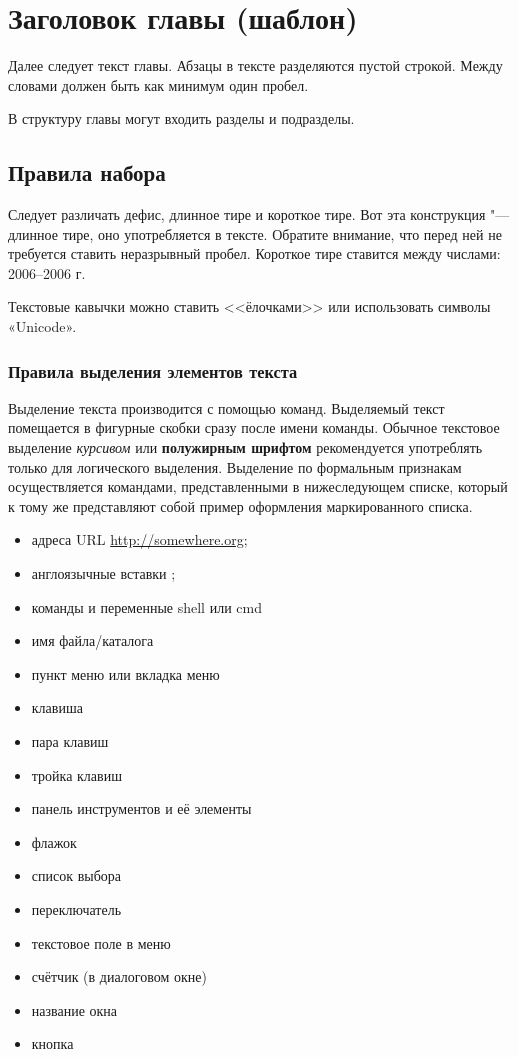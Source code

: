 \chapter{Заголовок главы (шаблон)}

Далее следует текст главы. Абзацы в тексте разделяются пустой
строкой. Между словами должен быть как минимум один пробел. 

В структуру главы могут входить разделы и
подразделы.

\section{Правила набора}

Следует различать дефис, длинное тире и короткое тире. Вот эта конструкция "--- длинное
тире, оно употребляется в тексте. Обратите внимание, что перед ней не требуется ставить
неразрывный пробел. Короткое тире ставится между числами: 2006--2006 г.

Текстовые кавычки можно ставить <<ёлочками>> или использовать
символы «Unicode».

\subsection{Правила выделения элементов текста}

Выделение текста производится с помощью команд. Выделяемый текст
помещается в фигурные скобки сразу после имени команды. Обычное
текстовое выделение \emph{курсивом} или \textbf{полужирным шрифтом}
рекомендуется употреблять только для логического выделения. Выделение
по формальным признакам осуществляется командами, представленными в
нижеследующем списке, который к тому же представляют собой пример оформления
маркированного списка.

\begin{itemize}
\item адреса URL \url{http://somewhere.org};
\item англоязычные вставки ;
\item команды и переменные shell или cmd 
\item имя файла/каталога 
\item пункт меню или вкладка меню 
\item клавиша 
\item пара клавиш 
\item тройка клавиш 
\item панель инструментов и её элементы \panel{}
\item флажок \checkbox{}
\item список выбора \select{}
\item переключатель \radio{}
\item текстовое поле в меню \tarea{}
\item счётчик (в диалоговом окне) \counter{}
\item название окна \window{}
\item кнопка \button{}
\end{itemize}

